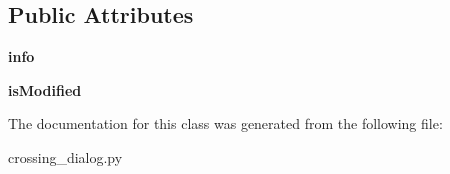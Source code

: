 \subsection*{Public Attributes}
\begin{DoxyCompactItemize}
\item 
\hypertarget{class_sim_g_d_c_1_1crossing__dialog_1_1_crossing_dialog_a580203ae3b823d38f53ecad1896daf3b}{}{\bfseries info}\label{class_sim_g_d_c_1_1crossing__dialog_1_1_crossing_dialog_a580203ae3b823d38f53ecad1896daf3b}

\item 
\hypertarget{class_sim_g_d_c_1_1crossing__dialog_1_1_crossing_dialog_a75f2b60cd5702a7a7cc79f8df4a746ad}{}{\bfseries is\+Modified}\label{class_sim_g_d_c_1_1crossing__dialog_1_1_crossing_dialog_a75f2b60cd5702a7a7cc79f8df4a746ad}

\end{DoxyCompactItemize}


The documentation for this class was generated from the following file\+:\begin{DoxyCompactItemize}
\item 
crossing\+\_\+dialog.\+py\end{DoxyCompactItemize}
